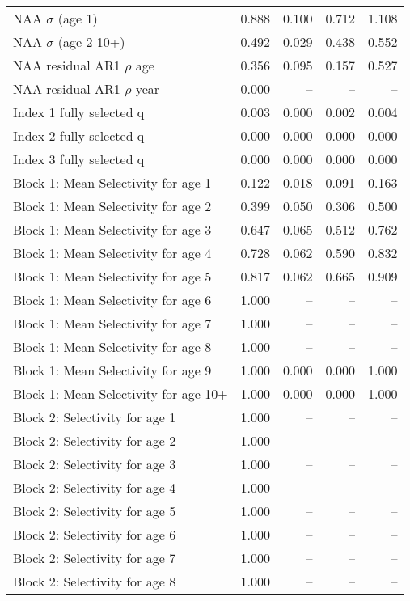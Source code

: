 \documentclass[
]{article}
\begin{document}
\begin{landscape}
\begin{longtable}[t]{lrrrr}
\endfoot
\bottomrule
\endlastfoot
NAA $\sigma$ (age 1) & 0.888 & 0.100 & 0.712 & 1.108\\
NAA $\sigma$ (age 2-10+) & 0.492 & 0.029 & 0.438 & 0.552\\
NAA residual AR1 $\rho$ age & 0.356 & 0.095 & 0.157 & 0.527\\
NAA residual AR1 $\rho$ year & 0.000 & -- & -- & --\\
Index 1 fully selected q & 0.003 & 0.000 & 0.002 & 0.004\\
\addlinespace
Index 2 fully selected q & 0.000 & 0.000 & 0.000 & 0.000\\
Index 3 fully selected q & 0.000 & 0.000 & 0.000 & 0.000\\
Block 1: Mean Selectivity for age 1 & 0.122 & 0.018 & 0.091 & 0.163\\
Block 1: Mean Selectivity for age 2 & 0.399 & 0.050 & 0.306 & 0.500\\
Block 1: Mean Selectivity for age 3 & 0.647 & 0.065 & 0.512 & 0.762\\
\addlinespace
Block 1: Mean Selectivity for age 4 & 0.728 & 0.062 & 0.590 & 0.832\\
Block 1: Mean Selectivity for age 5 & 0.817 & 0.062 & 0.665 & 0.909\\
Block 1: Mean Selectivity for age 6 & 1.000 & -- & -- & --\\
Block 1: Mean Selectivity for age 7 & 1.000 & -- & -- & --\\
Block 1: Mean Selectivity for age 8 & 1.000 & -- & -- & --\\
\addlinespace
Block 1: Mean Selectivity for age 9 & 1.000 & 0.000 & 0.000 & 1.000\\
Block 1: Mean Selectivity for age 10+ & 1.000 & 0.000 & 0.000 & 1.000\\
Block 2: Selectivity for age 1 & 1.000 & -- & -- & --\\
Block 2: Selectivity for age 2 & 1.000 & -- & -- & --\\
Block 2: Selectivity for age 3 & 1.000 & -- & -- & --\\
\addlinespace
Block 2: Selectivity for age 4 & 1.000 & -- & -- & --\\
Block 2: Selectivity for age 5 & 1.000 & -- & -- & --\\
Block 2: Selectivity for age 6 & 1.000 & -- & -- & --\\
Block 2: Selectivity for age 7 & 1.000 & -- & -- & --\\
Block 2: Selectivity for age 8 & 1.000 & -- & -- & --\\

\end{longtable}
\end{landscape}
\end{document}
